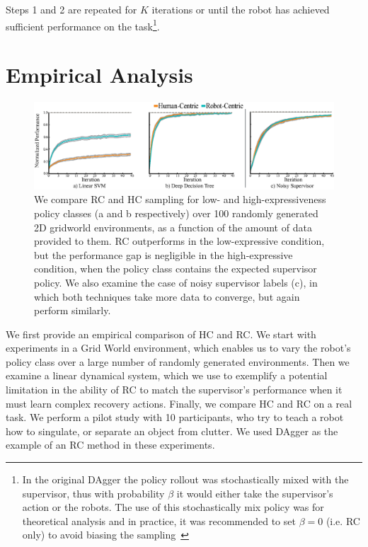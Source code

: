 \documentclass[10pt, conference]{ieeeconf}      %
\begin{document}
\noindent Steps 1 and 2 are repeated for $K$ iterations or until the robot has achieved sufficient performance on the
task\footnote{In the original DAgger the policy rollout was stochastically mixed with the supervisor, thus with
    probability $\beta$ it would either take the supervisor's action or the robots. The use of this stochastically mix
    policy was for theoretical analysis and in practice, it was recommended to set $\beta = 0$ (i.e. RC only) to avoid biasing the
sampling~\cite{NIPS2014_5421,ross2010reduction}}.


 


\section{Empirical Analysis}

\begin{figure}
\includegraphics{f_figs/var_grid.eps}
\caption{
    \footnotesize
We compare RC and HC sampling for low- and high-expressiveness policy classes (a and b respectively) over 100 randomly generated 2D gridworld environments, as a function of the amount of data provided to them. RC outperforms in the low-expressive condition, but the performance gap is negligible in the high-expressive condition, when the policy class contains the expected supervisor policy. We also examine the case of noisy supervisor labels (c), in which both techniques take more data to converge, but again perform similarly. 
}
\vspace*{-20pt}
\label{fig:var}
\end{figure}

We first provide an empirical comparison of HC and RC. 
We start with experiments in a Grid World environment, which enables us to vary the robot's policy class over a large number of randomly generated environments. Then we examine a linear dynamical system, which we use to exemplify a potential limitation in the ability of RC to match the supervisor's performance when it must learn complex recovery actions.
Finally, we compare HC and RC on a real task. We perform a pilot study with 10 participants, who try to teach a robot how to singulate, or separate an object from clutter. We used DAgger as the example of an RC method in these experiments. 
\end{document}
